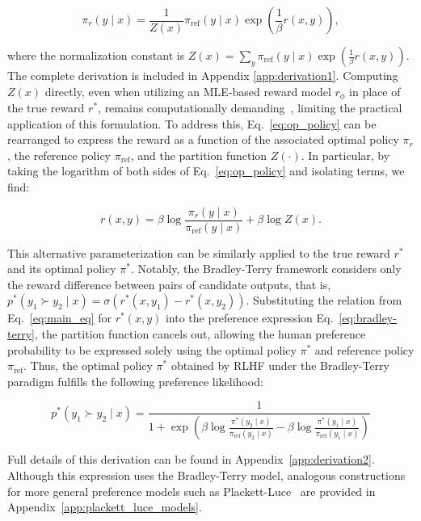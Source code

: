 \begin{equation}\label{eq:op_policy}
    \pi_r(y\mid x) = \frac{1}{Z(x)}\pi_\text{ref}(y\mid x)\exp\left(\frac{1}{\beta}r(x, y)\right),
\end{equation}

where the normalization constant is $Z(x) =\sum_{y}\pi_\text{ref}(y\mid x)\exp\left(\frac{1}{\beta}r(x, y)\right)$. The complete derivation is included in Appendix \ref{app:derivation1}. Computing $Z(x)$ directly, even when utilizing an MLE-based reward model $r_\phi$ in place of the true reward $r^*$, remains computationally demanding~\citep{korbak2022reinforcement, go2023aligning}, limiting the practical application of this formulation. To address this, Eq.~\ref{eq:op_policy} can be rearranged to express the reward as a function of the associated optimal policy $\pi_r$, the reference policy $\pi_\text{ref}$, and the partition function $Z(\cdot)$. In particular, by taking the logarithm of both sides of Eq.~\ref{eq:op_policy} and isolating terms, we find:

\begin{equation}\label{eq:main_eq}
    r(x,y) =\beta \log \frac{\pi_r(y\mid x)}{\pi_\text{ref}(y\mid x)} + \beta \log Z(x).
\end{equation}

This alternative parameterization can be similarly applied to the true reward $r^*$ and its optimal policy $\pi^*$. Notably, the Bradley-Terry framework considers only the reward difference between pairs of candidate outputs, that is, ${p^*(y_1 \succ y_2 \mid x) = \sigma(r^*(x, y_1) - r^*(x, y_2))}$. Substituting the relation from Eq.~\ref{eq:main_eq} for $r^*(x, y)$ into the preference expression Eq.~\ref{eq:bradley-terry}, the partition function cancels out, allowing the human preference probability to be expressed solely using the optimal policy $\pi^*$ and reference policy $\pi_\text{ref}$. Thus, the optimal policy $\pi^*$ obtained by RLHF under the Bradley-Terry paradigm fulfills the following preference likelihood:

\begin{equation}\label{eq:objective}
    p^*(y_1\succ y_2 \mid x)=\frac{1}{1 + \exp\left(\beta \log \frac{\pi^*(y_2\mid x)}{\pi_\text{ref}(y_2\mid x)} - \beta \log \frac{\pi^*(y_1\mid x)}{\pi_\text{ref}(y_1\mid x)}\right)}
\end{equation}

Full details of this derivation can be found in Appendix~\ref{app:derivation2}. Although this expression uses the Bradley-Terry model, analogous constructions for more general preference models such as Plackett-Luce~\citep{plackett1975analysis, luce2012individual} are provided in Appendix~\ref{app:plackett_luce_models}.

